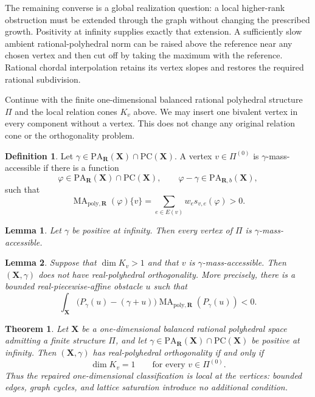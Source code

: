 \documentclass[11pt,a4paper]{article}
\newtheorem{theorem}{Theorem}[section]
\newtheorem{lemma}[lemma]{Lemma}
\theoremstyle{definition}
\newtheorem{definition}[definition]{Definition}
\theoremstyle{remark}
\DeclareMathOperator{\MA}{MA}
\begin{document}
The remaining converse is a global realization question: a local
higher-rank obstruction must be extended through the graph without changing
the prescribed growth.  Positivity at infinity supplies exactly that
extension.  A sufficiently slow ambient rational-polyhedral norm can be
raised above the reference near any chosen vertex and then cut off by taking
the maximum with the reference.  Rational chordal interpolation retains its
vertex slopes and restores the required rational subdivision.



Continue with the finite one-dimensional balanced rational polyhedral
structure $\Pi$ and the local relation cones $K_v$ above.  We may insert one
bivalent vertex in every component without a vertex.  This does not change
any original relation cone or the orthogonality problem.

\begin{definition}
\label{def:frontier-polyhedral-mass-accessible}
Let $\gamma\in\mathrm{PA}_{\mathbf R}(\mathbf X)\cap
\mathrm{PC}(\mathbf X)$.  A vertex $v\in\Pi^{(0)}$ is
$\gamma$-mass-accessible if there is a function
\[
 \varphi\in\mathrm{PA}_{\mathbf R}(\mathbf X)\cap
 \mathrm{PC}(\mathbf X),
 \qquad
 \varphi-\gamma\in\mathrm{PA}_{\mathbf R,b}(\mathbf X),
\]
such that
\[
 \MA_{\mathrm{poly},\mathbf R}(\varphi)\{v\}
 =\sum_{e\in E(v)}w_es_{v,e}(\varphi)>0.
\]
\end{definition}

\begin{lemma}
\label{lem:frontier-polyhedral-ambient-vertex-accessibility}
Let $\gamma$ be positive at infinity.  Then every vertex of $\Pi$ is
$\gamma$-mass-accessible.
\end{lemma}

\begin{lemma}
\label{lem:frontier-polyhedral-accessible-mass-obstruction}
Suppose that $\dim K_v>1$ and that $v$ is
$\gamma$-mass-accessible.  Then $(\mathbf X,\gamma)$ does not have
real-polyhedral orthogonality.  More precisely, there is a bounded
real-piecewise-affine obstacle $u$ such that
\[
 \int_{\mathbf X}
 \bigl(P_\gamma(u)-(\gamma+u)\bigr)
 \MA_{\mathrm{poly},\mathbf R}(P_\gamma(u))<0.
\]
\end{lemma}

\begin{theorem}
\label{thm:frontier-polyhedral-graph-orthogonality-classification}
Let $\mathbf X$ be a one-dimensional balanced rational polyhedral space
admitting a finite structure $\Pi$, and let
$\gamma\in\mathrm{PA}_{\mathbf R}(\mathbf X)\cap
\mathrm{PC}(\mathbf X)$ be positive at infinity.  Then
$(\mathbf X,\gamma)$ has real-polyhedral orthogonality if and only if
\[
                         \dim K_v=1
                         \qquad\text{for every }v\in\Pi^{(0)}.
\]
Thus the repaired one-dimensional classification is local at the vertices:
bounded edges, graph cycles, and lattice saturation introduce no additional
condition.
\end{theorem}
\end{document}

